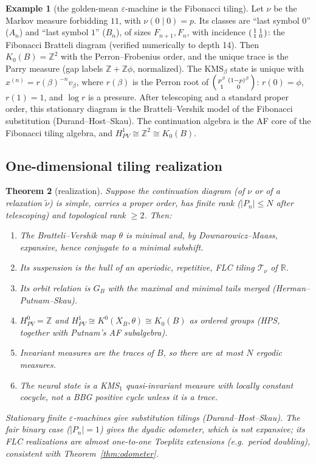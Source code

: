 \documentclass[11pt]{article}
\newtheorem{theorem}{Theorem}[section]
\theoremstyle{definition}
\newtheorem{example}[theorem]{Example}
\theoremstyle{remark}
\newcommand{\Z}{\mathbb Z}
\newcommand{\R}{\mathbb R}
\begin{document}
\begin{example}[the golden-mean $\varepsilon$-machine is the Fibonacci tiling]\label{ex:fib}
Let $\nu$ be the Markov measure forbidding $11$, with $\nu(0\mid0)=p$. Its classes are ``last symbol $0$'' ($A_n$) and ``last symbol $1$'' ($B_n$), of sizes $F_{n+1},F_n$, with incidence $\begin{psmallmatrix}1&1\\1&0\end{psmallmatrix}$: the Fibonacci Bratteli diagram (verified numerically to depth 14). Then $K_0(B)=\Z^2$ with the Perron--Frobenius order, and the unique trace is the Parry measure (gap labels $\Z+\Z\phi$, normalized). The KMS$_\beta$ state is unique with $x^{(n)}=r(\beta)^{-n}v_\beta$, where $r(\beta)$ is the Perron root of $\begin{psmallmatrix}p^\beta&(1-p)^\beta\\1&0\end{psmallmatrix}$: $r(0)=\phi$, $r(1)=1$, and $\log r$ is a pressure. After telescoping and a standard proper order, this stationary diagram is the Bratteli--Vershik model of the Fibonacci substitution (Durand--Host--Skau). The continuation algebra is the AF core of the Fibonacci tiling algebra, and $H^1_{PV}\cong\Z^2\cong K_0(B)$.
\end{example}

\subsection{One-dimensional tiling realization}

\begin{theorem}[realization]\label{thm:realize}
Suppose the continuation diagram (of $\nu$ or of a relaxation $\tilde\nu$) is simple, carries a proper order, has finite rank ($|P_n|\le N$ after telescoping) and topological rank $\ge2$. Then:
\begin{enumerate}
\item The Bratteli--Vershik map $\theta$ is minimal and, by Downarowicz--Maass, expansive, hence conjugate to a minimal subshift.
\item Its suspension is the hull of an aperiodic, repetitive, FLC tiling $\mathcal T_\nu$ of $\R$.
\item Its orbit relation is $G_B$ with the maximal and minimal tails merged (Herman--Putnam--Skau).
\item $H^0_{PV}=\Z$ and $H^1_{PV}\cong K^0(X_B,\theta)\cong K_0(B)$ as ordered groups (HPS, together with Putnam's AF subalgebra).
\item Invariant measures are the traces of $B$, so there are at most $N$ ergodic measures.
\item The neural state is a KMS$_1$ quasi-invariant measure with locally constant cocycle, not a BBG positive cycle unless it is a trace.
\end{enumerate}
Stationary finite $\varepsilon$-machines give substitution tilings (Durand--Host--Skau). The fair binary case ($|P_n|=1$) gives the dyadic odometer, which is not expansive; its FLC realizations are almost one-to-one Toeplitz extensions (e.g.\ period doubling), consistent with Theorem~\ref{thm:odometer}.
\end{theorem}
\end{document}
